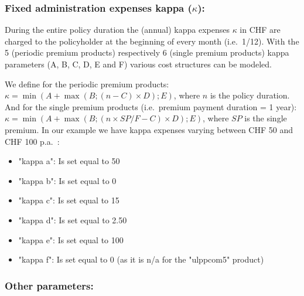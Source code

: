 \subsubsection{Fixed administration expenses kappa ($\kappa$):}

During the entire policy duration the (annual) kappa expenses $\kappa$ in CHF are charged to the policyholder at the beginning of every month (i.e.~1/12). With the 5 (periodic premium products) respectively 6 (single premium products) kappa parameters (A, B, C, D, E and F) various cost structures can be modeled.

We define for the periodic premium products: 
$\kappa = \min (A + \max (B;(n-C) \times D); E)$, where $n$ is the policy duration.
And for the single premium products (i.e.~premium payment duration = 1 year):
$\kappa = \min (A + \max (B;(n \times{{SP}/{F}}-C) \times D); E)$, where $SP$ is the single premium.
In our example we have kappa expenses varying between CHF 50 and CHF 100 p.a.~:
\begin{itemize}
	\item "kappa a": Is set equal to 50
	\item "kappa b": Is set equal to 0
	\item "kappa c": Is set equal to 15
	\item "kappa d": Is set equal to 2.50
	\item "kappa e": Is set equal to 100
	\item "kappa f": Is set equal to 0 (as it is n/a for the "ulppcom5" product)
\end{itemize}

\subsubsection{Other parameters:}

